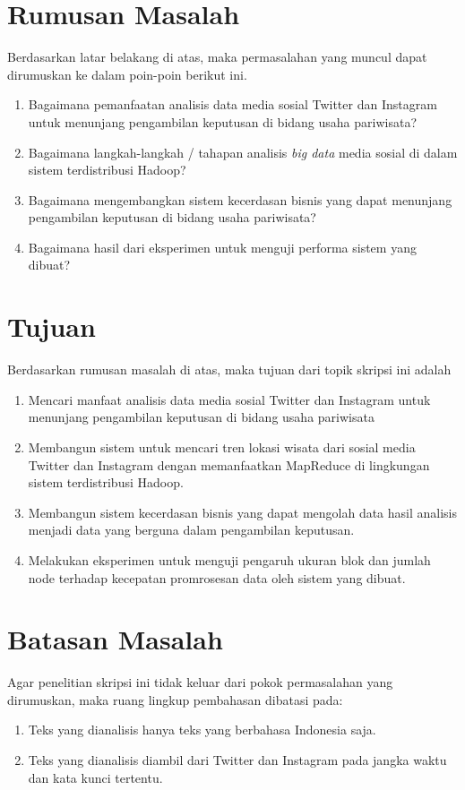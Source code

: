 \section{Rumusan Masalah}
\label{sec:rumusan_masalah}
Berdasarkan latar belakang di atas, maka permasalahan yang muncul dapat dirumuskan ke dalam poin-poin berikut ini.
\begin{enumerate}
	\item Bagaimana pemanfaatan analisis data media sosial Twitter dan Instagram untuk menunjang pengambilan keputusan di bidang usaha pariwisata?
	\item Bagaimana langkah-langkah / tahapan analisis \textit{big data} media sosial di dalam sistem terdistribusi Hadoop?
	\item Bagaimana mengembangkan sistem kecerdasan bisnis yang dapat menunjang pengambilan keputusan di bidang usaha pariwisata?
	\item Bagaimana hasil dari eksperimen untuk menguji performa sistem yang dibuat?
\end{enumerate}

\section{Tujuan}
\label{sec:tujuan}
Berdasarkan rumusan masalah di atas, maka tujuan dari topik skripsi ini adalah 
\begin{enumerate}
	\item Mencari manfaat analisis data media sosial Twitter dan Instagram untuk menunjang pengambilan keputusan di bidang usaha pariwisata
	\item Membangun sistem untuk mencari tren lokasi wisata dari sosial media Twitter dan Instagram dengan memanfaatkan MapReduce di lingkungan sistem terdistribusi Hadoop.
	\item Membangun sistem kecerdasan bisnis yang dapat mengolah data hasil analisis menjadi data yang berguna dalam pengambilan keputusan.
	\item Melakukan eksperimen untuk menguji pengaruh ukuran blok dan jumlah node terhadap kecepatan promrosesan data oleh sistem yang dibuat.
\end{enumerate}

\section{Batasan Masalah}
\label{sec:batasan_masalah}
Agar penelitian skripsi ini tidak keluar dari pokok permasalahan yang dirumuskan, maka ruang lingkup pembahasan dibatasi pada:
\begin{enumerate}
	\item Teks yang dianalisis hanya teks yang berbahasa Indonesia saja. 
	\item Teks yang dianalisis diambil dari Twitter dan Instagram pada jangka waktu dan kata kunci tertentu.
\end{enumerate}

